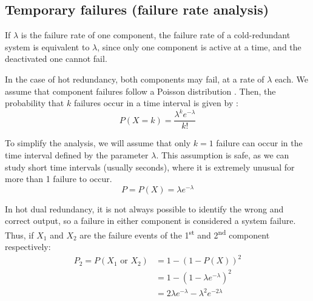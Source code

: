 \documentclass[a4paper,nobib,final]{tufte-book}
\begin{document}
\subsection{Temporary failures (failure rate analysis)}

If \( \lambda \) is the failure rate of one component, the failure rate of a cold-redundant system is equivalent to \( \lambda \), since only one component is active at a time, and the deactivated one cannot fail.


In the case of hot redundancy, both components may fail, at a rate of \( \lambda \) each. We assume that component failures follow a Poisson distribution \autocite[35]{birolini_reliability_engineering_2004}. Then, the probability that \(k\) failures occur in a time interval is given by \autocite[60]{yates_probability_stochastic_2014}:
	\begin{equation}
	P(X=k) = \frac{\lambda^ke^{-\lambda}}{k!}
	\end{equation}
	

To simplify the analysis, we will assume that only \(k = 1\) failure can occur in the time interval defined by the parameter \( \lambda \). This assumption is safe, as we can study short time intervals (usually seconds), where it is extremely unusual for more than 1 failure to occur.
	\begin{equation}
	P = P(X) = \lambda e^{-\lambda}
	\end{equation}
	
In hot dual redundancy, it is not always possible to identify the wrong and correct output, so a failure in either component is considered a system failure. Thus, if \(X_1\) and \(X_2\) are the failure events of the 1\textsuperscript{st} and 2\textsuperscript{nd} component respectively:
\begin{align}
P_2 = P(X_1\text{ or }X_2) &= 1 - (1 - P(X))^2 \nonumber\\
&= 1 - \left(1 - \lambda e^{-\lambda} \right)^2 \nonumber\\
&=  2 \lambda e^{-\lambda} -\lambda^2e^{-2\lambda} \label{eq:lambda}
\end{align}
	
\end{document}
